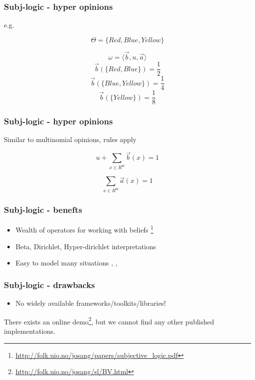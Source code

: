 \documentclass{beamer}
\begin{document}
\begin{frame}
\frametitle{Subj-logic - hyper opinions}

e.g.

$$\Theta = \lbrace Red, Blue, Yellow \rbrace$$

$$\omega = \langle \vec{b}, u, \vec{a} \rangle$$
$$\vec{b}\left(\lbrace Red, Blue \rbrace \right) = \frac{1}{2}$$
$$\vec{b}\left(\lbrace Blue, Yellow \rbrace \right) = \frac{1}{4}$$
$$\vec{b}\left(\lbrace Yellow \rbrace \right) = \frac{1}{8}$$

\end{frame}

\begin{frame}
\frametitle{Subj-logic - hyper opinions}

Similar to multinomial opinions, rules apply

$$u + \sum_{x \in R^\Theta} \vec{b}\left(x\right) = 1$$

$$\sum_{x \in R^\Theta} \vec{a}\left(x\right) = 1$$

\end{frame}

\begin{frame}
\frametitle{Subj-logic - benefts}

\begin{itemize}
  \item Wealth of operators for working with beliefs
     \footnote{\url{http://folk.uio.no/josang/papers/subjective_logic.pdf}}
  \item Beta, Dirichlet, Hyper-dirichlet interpretations
  \item Easy to model many situations
    \cite{josang2008conditional}, \cite{josang2006trust}, \cite{kent2010application}
\end{itemize}

\end{frame}

\begin{frame}
\frametitle{Subj-logic - drawbacks}

\begin{itemize}
  \item No widely available frameworks/toolkits/libraries!
\end{itemize}

There exists an online demo\footnote{\url{http://folk.uio.no/josang/sl/BV.html}},
but we cannot find any other published implementations.

\end{frame}
\end{document}

